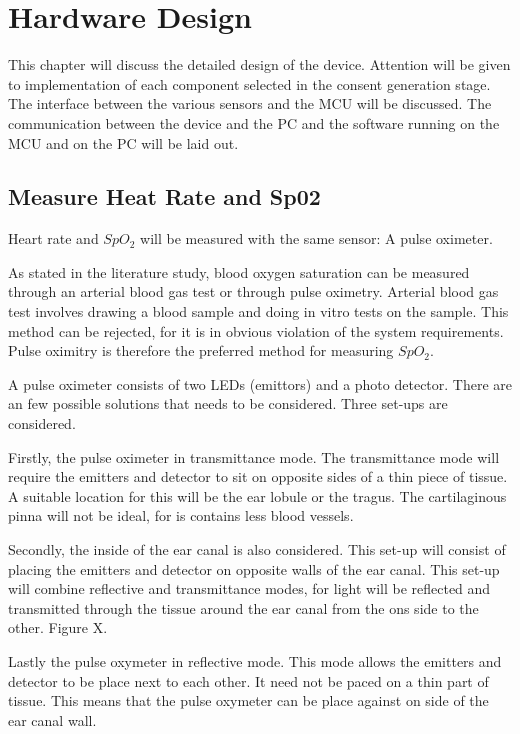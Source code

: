 \chapter{Hardware Design}
\label{chp:DEM}
This chapter will discuss the detailed design of the device. Attention will be given to implementation of each component selected in the consent generation stage. The interface between the various sensors and the MCU will be discussed. The communication between the device and the PC and the software running on the MCU and on the PC will be laid out.

\section{Measure Heat Rate and Sp02}
Heart rate and \( SpO_2 \) will be measured with the same sensor: A pulse oximeter. 

As stated in the literature study, blood oxygen saturation can be measured through an arterial blood gas test or through pulse oximetry. Arterial blood gas test involves drawing a blood sample and doing in vitro tests on the sample. This method can be rejected, for it is in obvious violation of the system requirements. Pulse oximitry is therefore the preferred method for measuring \( SpO_2 \).

A pulse oximeter consists of two LEDs (emittors) and a photo detector. There are an few possible solutions that needs to be considered. Three set-ups are considered.

Firstly, the pulse oximeter in transmittance mode. The transmittance mode will require the emitters and detector to sit on opposite sides of a thin piece of tissue. A suitable location for this will be the ear lobule or the tragus. The cartilaginous pinna will not be ideal, for is contains less blood vessels.

Secondly, the inside of the ear canal is also considered. This set-up will consist of placing the emitters and detector on opposite walls of the ear canal. This set-up will combine reflective and transmittance modes, for light will be reflected and transmitted through the tissue around the ear canal from the ons side to the other. Figure X.

Lastly the pulse oxymeter in reflective mode. This mode allows the emitters and detector to be place next to each other. It need not be paced on a thin part of tissue. This means that the pulse oxymeter can be place against on side of the ear canal wall.



